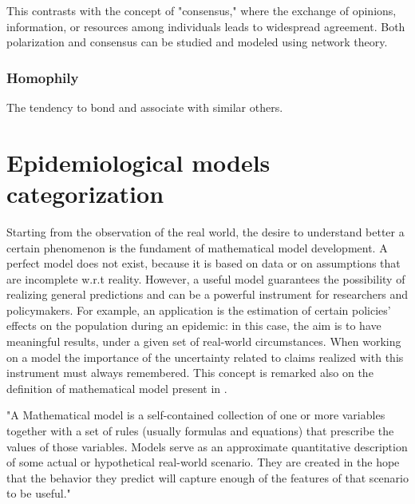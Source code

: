 This contrasts with the concept of "consensus," where the exchange of opinions, information, or resources among individuals leads to widespread agreement. Both polarization and consensus can be studied and modeled using network theory.

\subsubsection{Homophily} The tendency to bond and associate with similar others. 

\section{Epidemiological models categorization}
\label{sec:models_categ}
Starting from the observation of the real world, the desire to understand better a certain phenomenon is the fundament of mathematical model development. A perfect model does not exist, because it is based on data or on assumptions that are incomplete w.r.t reality. However, a useful model guarantees the possibility of realizing general predictions and can be a powerful instrument for researchers and policymakers.  For example, an application is the estimation of certain policies' effects on the population during an epidemic: in this case, the aim is to have meaningful results, under a given set of real-world circumstances.
When working on a model the importance of the uncertainty related to claims realized with this instrument must always remembered. This concept is remarked also on the definition of mathematical model present in \cite{Ledder_2023}. 
\begin{displayquote}
	"A Mathematical model is a self-contained collection of one or more variables together with a set of rules (usually formulas and equations) that prescribe the values of those variables. Models serve as an approximate quantitative description of some actual or hypothetical real-world scenario. They are created in the hope that the behavior they predict will capture enough of the features of that scenario to be useful."
\end{displayquote}

